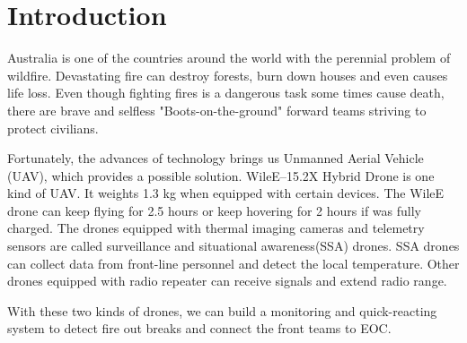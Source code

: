 \documentclass[13pt]{ctexart} %
\begin{document}
\setmainfont[
    BoldFont       = texgyrepagella-bold.otf ,
    ItalicFont     = texgyrepagella-italic.otf ,
    BoldItalicFont = texgyrepagella-bolditalic.otf ]{texgyrepagella-regular.otf}

\newpage
\thispagestyle{empty}
\tableofcontents
\newpage
\setcounter{page}{1}

\fancyhf{}
\fancyhead[C]{ }
\fancyfoot[C]{\bfseries\thepage}

\section{Introduction}
Australia is one of the countries around the world with the perennial problem of wildfire. Devastating fire can destroy forests, burn down houses and even causes life loss. Even though fighting fires is a dangerous task some times cause death, there are brave and selfless "Boots-on-the-ground" forward teams striving to protect civilians.

Fortunately, the advances of technology brings us Unmanned Aerial Vehicle (UAV), which provides a possible solution. WileE–15.2X Hybrid Drone is one kind of UAV. It weights 1.3 kg when equipped with certain devices. The WileE drone can keep flying for 2.5 hours or keep hovering for 2 hours if was fully charged.
The drones equipped with thermal imaging cameras and telemetry sensors are called surveillance and situational awareness(SSA) drones. SSA drones can collect data from front-line personnel and detect the local temperature.
Other drones equipped with radio repeater can receive signals and  extend radio range.

With these two kinds of drones, we can build a monitoring and quick-reacting system to detect fire out breaks and connect the front teams to EOC.


\fancyfoot[C]{\bfseries\thepage}
\end{document}
